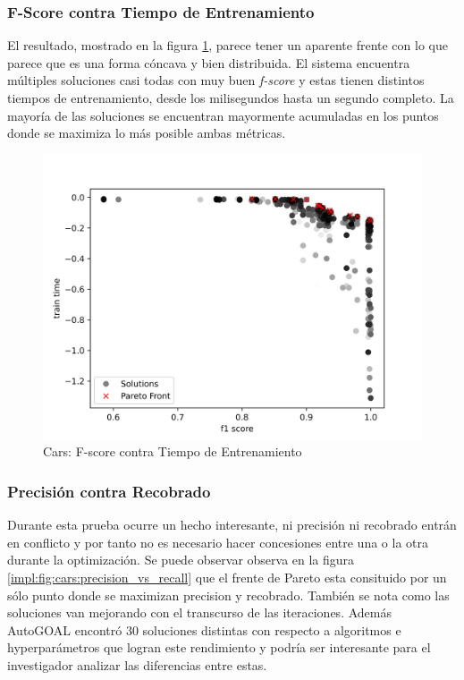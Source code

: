\subsubsection{F-Score contra Tiempo de Entrenamiento}
El resultado, mostrado en la figura \ref{impl:fig:cars:fscore_vs_time}, parece tener un aparente frente con lo que parece que es una forma c\'oncava y  bien distribuida.  El sistema encuentra m\'ultiples soluciones   casi todas con muy buen \textit{f-score} y estas tienen distintos tiempos de entrenamiento, desde los milisegundos hasta un segundo completo. La mayor\'ia de las soluciones se encuentran mayormente acumuladas en los puntos donde se maximiza lo m\'as posible ambas m\'etricas.

\begin{figure}[ht]
    \centering
    \includegraphics[scale=0.65]{Pictures/cars_fscore_vs_time.jpg}
    \caption{Cars: F-score contra Tiempo de Entrenamiento}
    \label{impl:fig:cars:fscore_vs_time}
\end{figure}


\subsubsection{Precisi\'on contra Recobrado}
Durante esta prueba ocurre un hecho interesante, ni precisi\'on ni recobrado entr\'an en conflicto y por tanto no es necesario hacer concesiones entre una o la otra durante la optimizaci\'on. Se puede observar observa en la figura \ref{impl:fig:cars:precision_vs_recall} que el frente de Pareto esta consituido por un s\'olo punto donde se maximizan precision y recobrado. Tambi\'en se nota como las soluciones van mejorando con el transcurso de las iteraciones.
Adem\'as AutoGOAL encontr\'o 30 soluciones distintas con respecto a algoritmos e hyperpar\'ametros que logran este rendimiento y podr\'ia ser interesante para el investigador analizar las diferencias entre estas.

